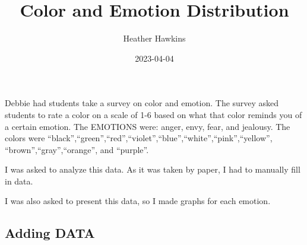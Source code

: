 \documentclass[
]{article}
\title{Color and Emotion Distribution}
\author{Heather Hawkins}
\date{2023-04-04}
\begin{document}
\maketitle

Debbie had students take a survey on color and emotion. The survey asked
students to rate a color on a scale of 1-6 based on what that color
reminds you of a certain emotion. The EMOTIONS were: anger, envy, fear,
and jealousy. The colors were
``black'',``green'',``red'',``violet'',``blue'',``white'',``pink'',``yellow'',
``brown'',``gray'',``orange'', and ``purple''.

I was asked to analyze this data. As it was taken by paper, I had to
manually fill in data.

I was also asked to present this data, so I made graphs for each
emotion.

\hypertarget{adding-data}{%
\subsection{Adding DATA}\label{adding-data}}
\end{document}
